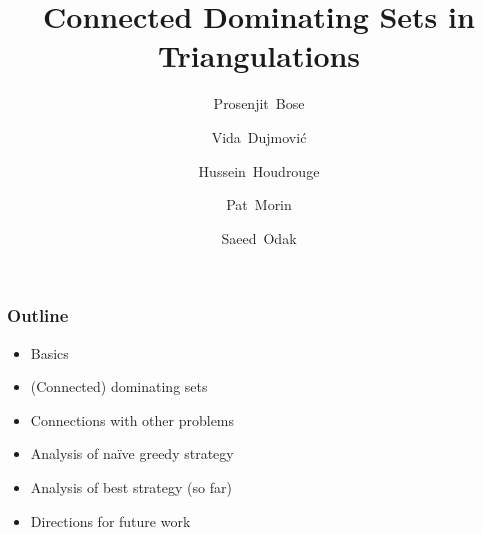 \documentclass{beamer}
\title{Connected Dominating Sets in Triangulations}
\author{%
  Prosenjit~Bose \and
  Vida~Dujmović \and
  Hussein~Houdrouge \and
  Pat~Morin \and
  Saeed~Odak}
\date{}
\begin{document}
\maketitle

\begin{frame}
  \frametitle{Outline}

  \begin{itemize}
    \item Basics
    \item (Connected) dominating sets
    \item Connections with other problems
    \item Analysis of naïve greedy strategy
    \item Analysis of best strategy (so far)
    \item Directions for future work
  \end{itemize}
\end{frame}
\end{document}
